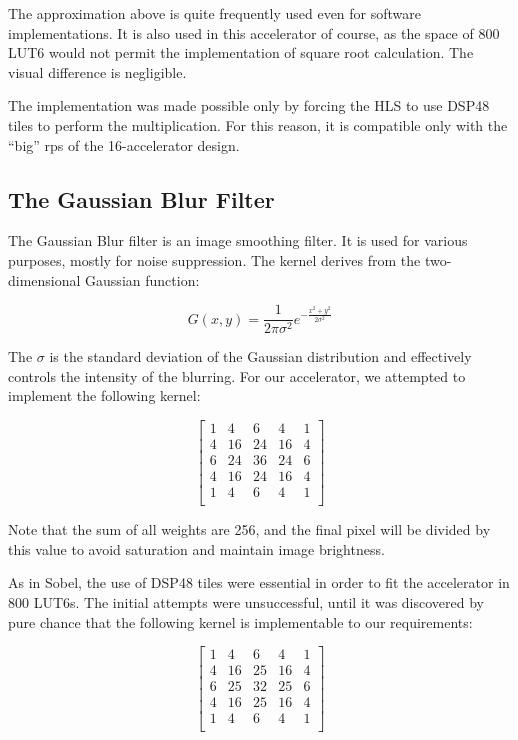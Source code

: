 The approximation above is quite frequently used even for software implementations.
It is also used in this accelerator of course, as the space of 800 LUT6 would not
permit the implementation of square root calculation. The visual difference is negligible.

The implementation was made possible only by forcing the HLS to use DSP48 tiles
to perform the multiplication. For this reason, it is compatible only with the 
``big'' \glspl{rp} of the 16-accelerator design.

\subsection{The Gaussian Blur Filter}

The Gaussian Blur filter is an image smoothing filter.
It is used for various purposes, mostly for noise suppression.
The kernel derives from the two-dimensional Gaussian function:

\[ G(x,y) = \frac{1}{2\pi\sigma^2} e^{-\frac{x^2 + y^2}{2\sigma^2}}	\]

The $\sigma$ is the standard deviation of the Gaussian distribution and effectively
controls the intensity of the blurring. For our accelerator, we attempted to implement
the following kernel:

\[
\left[
\begin{array}{rrrrr}
1  &   4  &  6  &  4  &  1 \\
4  &  16  &  24 & 16  &  4 \\
6  &  24  &  36 & 24  &  6 \\
4  &  16  &  24 & 16  &  4 \\
1  &   4  &  6  &  4  &  1 \\
\end{array}
\right]
\]

Note that the sum of all weights are 256, and the final pixel will be divided by this
value to avoid saturation and maintain image brightness.

As in Sobel, the use of DSP48 tiles were essential in order to fit the accelerator in 800 LUT6s.
The initial attempts were unsuccessful, until it was discovered by pure chance 
that the following kernel is implementable to our requirements:

\[
\left[
\begin{array}{rrrrr}
1  &   4  &  6  &  4  &  1 \\
4  &  16  &  25 & 16  &  4 \\
6  &  25  &  32 & 25  &  6 \\
4  &  16  &  25 & 16  &  4 \\
1  &   4  &  6  &  4  &  1 \\
\end{array}
\right]
\]


